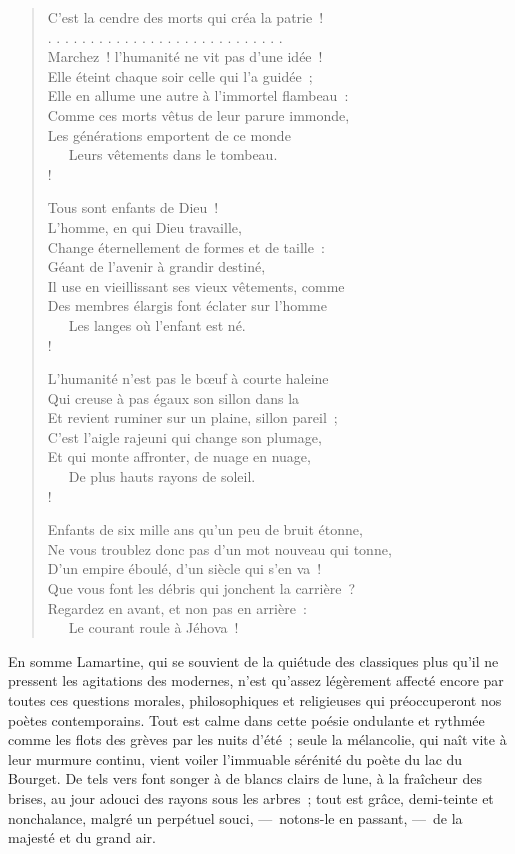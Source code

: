 \documentclass[french,twoside]{book} %
\begin{document}
\begin{verse}
C’est la cendre des morts qui créa la patrie !\\
. . . . . . . . . . . . . . . . . . . . . . . . . . . .\\
Marchez ! l’humanité ne vit pas d’une idée !\\
Elle éteint chaque soir celle qui l’a guidée ;\\
Elle en allume une autre à l’immortel flambeau :\\
Comme ces morts vêtus de leur parure immonde,\\
Les générations emportent de ce monde\\
   Leurs vêtements dans le tombeau.\\!

Tous sont enfants de Dieu !\\
L’homme, en qui Dieu travaille,\\
Change éternellement de formes et de taille :\\
Géant de l’avenir à grandir destiné,\\
Il use en vieillissant ses vieux vêtements, comme\\
Des membres élargis font éclater sur l’homme\\
   Les langes où l’enfant est né.\\!

L’humanité n’est pas le bœuf à courte haleine\\
Qui creuse à pas égaux son sillon dans la\\
Et revient ruminer sur un plaine, sillon pareil ;\\
C’est l’aigle rajeuni qui change son plumage,\\
Et qui monte affronter, de nuage en nuage,\\
   De plus hauts rayons de soleil.\\!

Enfants de six mille ans qu’un peu de bruit étonne,\\
Ne vous troublez donc pas d’un mot nouveau qui tonne,\\
D’un empire éboulé, d’un siècle qui s’en va !\\
Que vous font les débris qui jonchent la carrière ?\\
Regardez en avant, et non pas en arrière :\\
   Le courant roule à Jéhova !\\
\end{verse}

\noindent En somme Lamartine, qui se souvient de la quiétude des classiques plus qu’il ne pressent les agitations des modernes, n’est qu’assez légèrement affecté encore par toutes ces questions morales, philosophiques et religieuses qui préoccuperont nos poètes contemporains. Tout est calme dans cette poésie ondulante et rythmée comme les flots des grèves par les nuits d’été ; seule la mélancolie, qui naît vite à leur murmure continu, vient voiler l’immuable sérénité du poète du lac du Bourget. De tels vers font songer à de blancs clairs de lune, à la fraîcheur des brises, au jour adouci des rayons sous les arbres ; tout est grâce, demi-teinte et nonchalance, malgré un perpétuel souci, — notons-le en passant, — de la majesté et du grand air.
\end{document}
